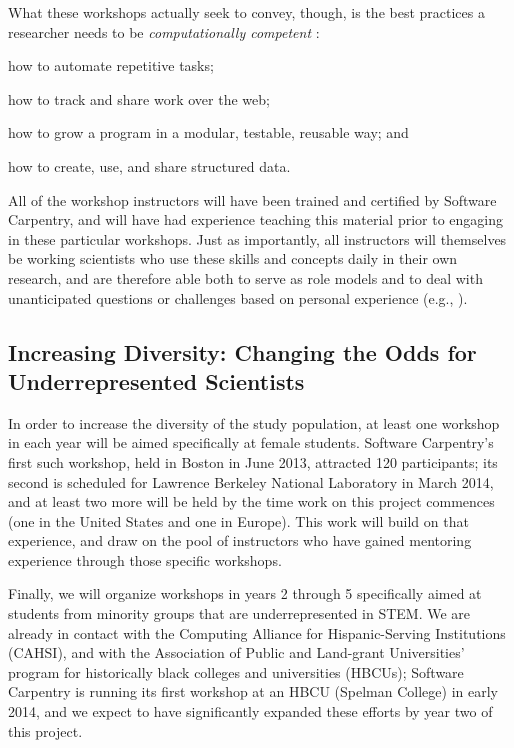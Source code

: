 \documentclass{proposalnsf}
\newlength{\up}
\begin{document}
What these workshops actually seek to convey, though, is the best
practices a researcher needs to be \emph{computationally competent}
\cite{wilson2013}:

\begin{compactitem}
\item
  how to automate repetitive tasks;
\item
  how to track and share work over the web;
\item
  how to grow a program in a modular, testable, reusable way; and
\item
  how to create, use, and share structured data.
\end{compactitem}

All of the workshop instructors will have been trained and certified
by Software Carpentry, and will have had experience teaching this
material prior to engaging in these particular workshops.  Just as
importantly, all instructors will themselves be working scientists who use these
skills and concepts daily in their own research, and are therefore
able both to serve as role models and to deal with unanticipated
questions or challenges based on personal experience (e.g.,
\cite{ram2013}).

\subsection{Increasing Diversity: Changing the Odds for Underrepresented Scientists}

In order to increase the diversity of the study population, at least
one workshop in each year will be aimed specifically at female
students.  Software Carpentry's first such workshop, held in Boston in
June 2013, attracted 120 participants; its second is scheduled for
Lawrence Berkeley National Laboratory in March 2014, and at least two
more will be held by the time work on this project commences (one in
the United States and one in Europe).  This work will build on that
experience, and draw on the pool of instructors who have gained
mentoring experience through those specific workshops.

Finally, we will organize workshops in years 2 through 5 specifically aimed
at students from minority groups that are underrepresented in STEM.
We are already in contact with the Computing Alliance for
Hispanic-Serving Institutions (CAHSI), and with the Association of
Public and Land-grant Universities' program for historically black
colleges and universities (HBCUs); Software Carpentry is running its
first workshop at an HBCU (Spelman College) in early 2014, and we expect to
have significantly expanded these efforts by year two of this project.
\end{document}
